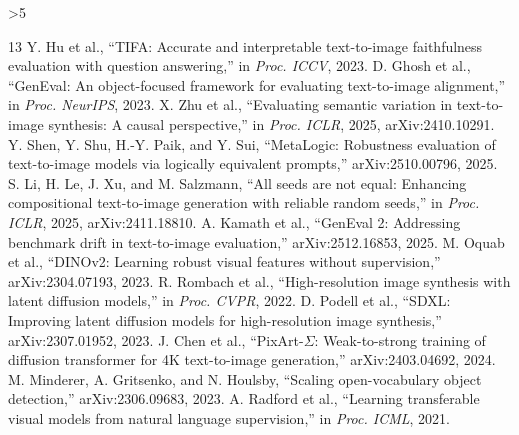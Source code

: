 \documentclass[10pt,letterpaper]{article}
\begin{document}
\clearpage
\ifnum\value{page}>5\PackageError{ParaSeedBench}{Technical content exceeds four pages}{Shorten the technical body; do not shrink below the permitted font size.}\fi
\begin{thebibliography}{13}
 Y. Hu et al., ``TIFA: Accurate and interpretable text-to-image faithfulness evaluation with question answering,'' in \emph{Proc. ICCV}, 2023.
 D. Ghosh et al., ``GenEval: An object-focused framework for evaluating text-to-image alignment,'' in \emph{Proc. NeurIPS}, 2023.
 X. Zhu et al., ``Evaluating semantic variation in text-to-image synthesis: A causal perspective,'' in \emph{Proc. ICLR}, 2025, arXiv:2410.10291.
 Y. Shen, Y. Shu, H.-Y. Paik, and Y. Sui, ``MetaLogic: Robustness evaluation of text-to-image models via logically equivalent prompts,'' arXiv:2510.00796, 2025.
 S. Li, H. Le, J. Xu, and M. Salzmann, ``All seeds are not equal: Enhancing compositional text-to-image generation with reliable random seeds,'' in \emph{Proc. ICLR}, 2025, arXiv:2411.18810.
 A. Kamath et al., ``GenEval 2: Addressing benchmark drift in text-to-image evaluation,'' arXiv:2512.16853, 2025.
 M. Oquab et al., ``DINOv2: Learning robust visual features without supervision,'' arXiv:2304.07193, 2023.
 R. Rombach et al., ``High-resolution image synthesis with latent diffusion models,'' in \emph{Proc. CVPR}, 2022.
 D. Podell et al., ``SDXL: Improving latent diffusion models for high-resolution image synthesis,'' arXiv:2307.01952, 2023.
 J. Chen et al., ``PixArt-$\Sigma$: Weak-to-strong training of diffusion transformer for 4K text-to-image generation,'' arXiv:2403.04692, 2024.
 M. Minderer, A. Gritsenko, and N. Houlsby, ``Scaling open-vocabulary object detection,'' arXiv:2306.09683, 2023.
 A. Radford et al., ``Learning transferable visual models from natural language supervision,'' in \emph{Proc. ICML}, 2021.
\end{thebibliography}
\end{document}
